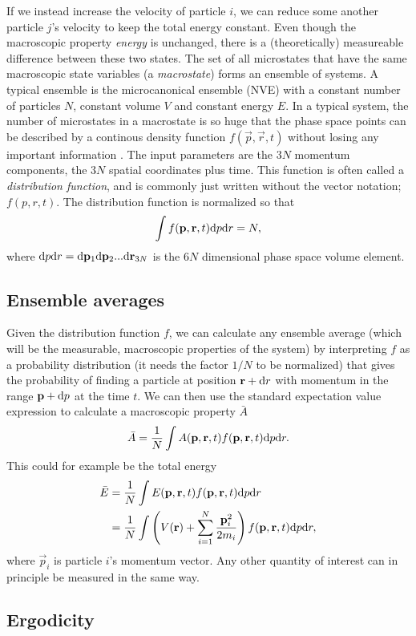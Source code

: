 If we instead increase the velocity of particle $i$, we can reduce some another particle $j$'s velocity to keep the total energy constant. Even though the macroscopic property \textit{energy} is unchanged, there is a (theoretically) measureable difference between these two states. The set of all microstates that have the same macroscopic state variables (a \textit{macrostate}) forms an ensemble of systems. A typical ensemble is the microcanonical ensemble (NVE) with a constant number of particles $N$, constant volume $V$ and constant energy $E$. In a typical system, the number of microstates in a macrostate is so huge that the phase space points can be described by a continous density function $f(\vec p, \vec r, t)$ without losing any important information \cite{mcquarrie1973statistical}. The input parameters are the $3N$ momentum components, the $3N$ spatial coordinates plus time. This function is often called a \textit{distribution function}, and is commonly just written without the vector notation; $f(p, r, t)$. The distribution function is normalized so that
\begin{align}
	\int f(\mathbf p, \mathbf r, t) \mathrm{d}\mathbf{\mathbf} p\mathrm{d}\mathbf{\mathbf} r = N,
\end{align}
where $\mathrm{d}\mathbf{\mathbf} p\mathrm{d}\mathbf{\mathbf} r=\mathrm{d}\mathbf{p}_1\mathrm{d}\mathbf{p}_2...\mathrm{d}\mathbf{r}_{3N}$ is the $6N$ dimensional phase space volume element. 

\subsection{Ensemble averages}
Given the distribution function $f$, we can calculate any ensemble average (which will be the measurable, macroscopic properties of the system) by interpreting $f$ as a probability distribution (it needs the factor $1/N$ to be normalized) that gives the probability of finding a particle at position $\mathbf r + \mathrm{d}\mathbf{\mathbf} r$ with momentum in the range $\mathbf p + \mathrm{d}\mathbf{\mathbf} p$ at the time $t$. We can then use the standard expectation value expression to calculate a macroscopic property $\bar A$
\begin{align}
	\bar A = {1\over N}\int A(\mathbf p, \mathbf r, t)f(\mathbf p, \mathbf r, t)\mathrm{d}\mathbf{\mathbf} p\mathrm{d}\mathbf{\mathbf} r.
\end{align}
This could for example be the total energy
\begin{align}
	\bar E &= {1\over N}\int E(\mathbf p, \mathbf r, t)f(\mathbf p, \mathbf r, t)\mathrm{d}\mathbf{\mathbf} p\mathrm{d}\mathbf{\mathbf} r \\
	&= {1\over N}\int \left(V(\mathbf r) + \sum_{i=1}^N \frac{\mathbf p_i^2}{2m_i} \right)f(\mathbf p, \mathbf r, t)\mathrm{d}\mathbf{\mathbf} p \mathrm{d}\mathbf{\mathbf} r,
\end{align}
where $\vec p_i$ is particle $i$'s momentum vector. Any other quantity of interest can in principle be measured in the same way. 
\subsection{Ergodicity}